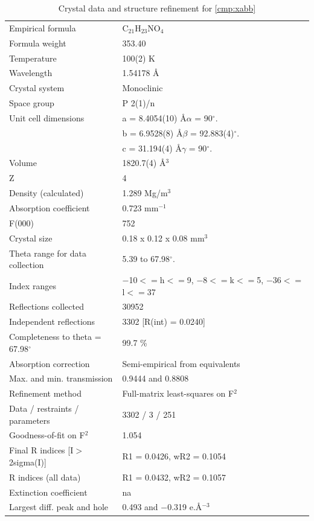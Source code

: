 \pagebreak
\begin{table}[h]
\centering
\caption{Crystal data and structure refinement for \ref{cmp:xabb}} 
\begin{tabular}{ll} 
\toprule
Empirical formula& 	C$_{21}$H$_{23}$NO$_4$ \\
Formula weight&	353.40 \\
Temperature &	100(2) K \\
Wavelength& 	1.54178 \AA  \\
Crystal system& 	Monoclinic \\
Space group& 	P 2(1)/n \\
Unit cell dimensions&	a = 8.4054(10) \AA	$\alpha$ = 90$^\circ$. \\
	&b = 6.9528(8) \AA	$\beta$ = 92.883(4)$^\circ$. \\
	&c = 31.194(4) \AA	$\gamma$ = 90$^\circ$. \\
Volume&	1820.7(4) \AA$^3$ \\
Z&	4 \\
Density (calculated)&	1.289 Mg/m$^3$ \\
Absorption coefficient&	0.723 mm$^{-1}$ \\
F(000) &	752 \\
Crystal size &	0.18 x 0.12 x 0.08 mm$^3$ \\
Theta range for data collection &	5.39 to 67.98$^\circ$. \\
Index ranges &	$-$10$<=$h$<=$9, $-$8$<=$k$<=$5, $-$36$<=$l$<=$37 \\
Reflections collected &	30952 \\
Independent reflections &	3302 [R(int) = 0.0240] \\
Completeness to theta = 67.98$^\circ$ &	99.7 \% \\ 
Absorption correction&	Semi-empirical from equivalents \\
Max. and min. transmission &	0.9444 and 0.8808 \\
Refinement method	&Full-matrix least-squares on F$^2$ \\
Data / restraints / parameters &	 3302 / 3 / 251 \\
Goodness-of-fit on F$^2$ & 	1.054 \\
Final R indices [I$>$2sigma(I)] &	R1 = 0.0426, wR2 = 0.1054 \\
R indices (all data) &	R1 = 0.0432, wR2 = 0.1057 \\
Extinction coefficient	& na \\
Largest diff. peak and hole &	0.493 and $-$0.319 e.\AA$^{-3}$ \\
\bottomrule
\end{tabular}
\end{table}

